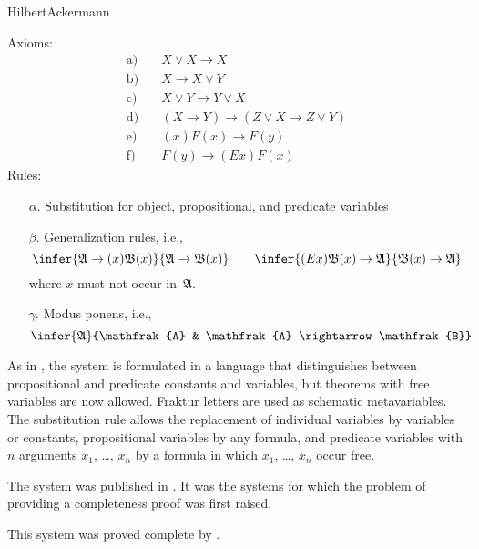 \begin{entry}{HilbertAckermann}  

\begin{calculus}
Axioms:
\begin{align*}
\text{a)} \quad & X \lor X \rightarrow X \\
\text{b)} \quad & X \rightarrow X \lor Y \\
\text{c)} \quad & X \lor Y \rightarrow Y \lor X\\
\text{d)} \quad & (X \rightarrow Y) \rightarrow (Z \lor X \rightarrow Z \lor Y)\\
\text{e)} \quad & (x)F(x) \rightarrow F(y)\\
\text{f)} \quad & F(y) \rightarrow (Ex)F(x)
\end{align*}
Rules:
\begin{enumerate}
\item[$\alpha$.] Substitution for object, propositional, and predicate variables
\item[$\beta$.] Generalization rules, i.e.,
\[
\infer{\mathfrak{A} \rightarrow (x)\mathfrak{B}(x)}{\mathfrak{A} \rightarrow \mathfrak{B}(x)}
\qquad
\infer{(Ex)\mathfrak{B}(x) \rightarrow \mathfrak{A}}{\mathfrak{B}(x) \rightarrow \mathfrak{A}}
\]
where $x$ must not occur in~$\mathfrak{A}$.
\item[$\gamma$.] Modus ponens, i.e.,
\[
\infer{\mathfrak{A}}{\mathfrak{A} & \mathfrak{A} \rightarrow \mathfrak{B}}
\]
\end{enumerate}

\end{calculus}

\begin{clarifications}
As in , the system is formulated in a language that
distinguishes between propositional and predicate constants and
variables, but theorems with free variables are now allowed. Fraktur letters are used as schematic metavariables. The
substitution rule allows the replacement of individual variables by
variables or constants, propositional variables by any formula, and
predicate variables with $n$ arguments $x_1$, \dots, $x_n$ by a
formula in which $x_1$, \dots, $x_n$ occur free.
\end{clarifications}

\begin{history}
The system was published in \cite{HilbertAckermann1928}. It was the
systems for which the problem of providing a completeness proof was
first raised.
\end{history}

\begin{technicalities}
This system was proved complete by \cite{Godel1930}.
\end{technicalities}

\end{entry}
